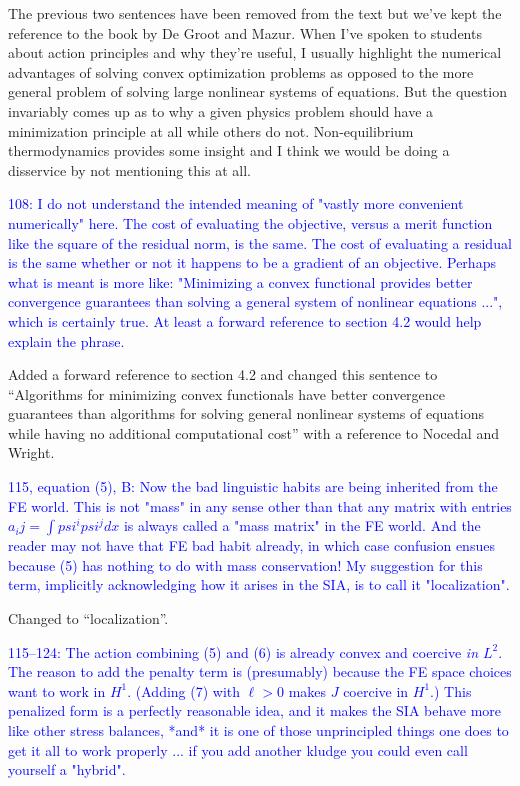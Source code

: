 \documentclass{article}
\theoremstyle{definition}
\theoremstyle{plain}
\begin{document}
The previous two sentences have been removed from the text but we've kept the reference to the book by De Groot and Mazur.
When I've spoken to students about action principles and why they're useful, I usually highlight the numerical advantages of solving convex optimization problems as opposed to the more general problem of solving large nonlinear systems of equations.
But the question invariably comes up as to why a given physics problem should have a minimization principle at all while others do not.
Non-equilibrium thermodynamics provides some insight and I think we would be doing a disservice by not mentioning this at all.

\textcolor{blue}{108:  I do not understand the intended meaning of "vastly more convenient numerically" here.  The cost of evaluating the objective, versus a merit function like the square of the residual norm, is the same.  The cost of evaluating a residual is the same whether or not it happens to be a gradient of an objective.  Perhaps what is meant is more like: "Minimizing a convex functional provides better convergence guarantees than solving a general system of nonlinear equations ...", which is certainly true.  At least a forward reference to section 4.2 would help explain the phrase.}

Added a forward reference to section 4.2 and changed this sentence to ``Algorithms for minimizing convex functionals have better convergence guarantees than algorithms for solving general nonlinear systems of equations while having no additional computational cost'' with a reference to Nocedal and Wright.

\textcolor{blue}{115, equation (5), B:  Now the bad linguistic habits are being inherited from the FE world.  This is not "mass" in any sense other than that any matrix with entries $a_ij = \int psi^i psi^j dx$ is always called a "mass matrix" in the FE world.  And the reader may not have that FE bad habit already, in which case confusion ensues because (5) has nothing to do with mass conservation!  My suggestion for this term, implicitly acknowledging how it arises in the SIA, is to call it "localization".}

Changed to ``localization''.

\textcolor{blue}{115--124:  The action combining (5) and (6) is already convex and coercive \emph{in $L^2$}.  The reason to add the penalty term is (presumably) because the FE space choices want to work in $H^1$.  (Adding (7) with $\ell > 0$ makes $J$ coercive in $H^1$.)  This penalized form is a perfectly reasonable idea, and it makes the SIA behave more like other stress balances, *and* it is one of those unprincipled things one does to get it all to work properly ... if you add another kludge you could even call yourself a "hybrid".}
\end{document}
